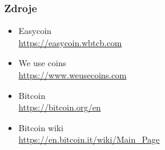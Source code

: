 \documentclass{beamer}
\begin{document}
\begin{frame}
\frametitle{Zdroje}
\begin{itemize}
\item Easycoin \\ \url{https://easycoin.wbtcb.com}
\item We use coins \\ \url{https://www.weusecoins.com}
\item Bitcoin \\ \url{https://bitcoin.org/en}
\item Bitcoin wiki \\ \url{https://en.bitcoin.it/wiki/Main_Page}
\end{itemize}
\end{frame}
\end{document}
